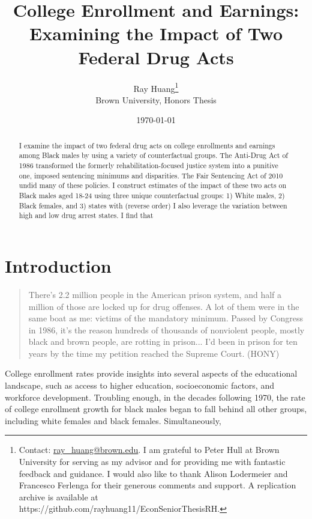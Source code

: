 \documentclass{article}
\title{College Enrollment and Earnings:
\texorpdfstring{\\}{} Examining the Impact of Two Federal Drug Acts}
\author{Ray Huang\thanks{Contact:
    \href{mailto:ray_huang@brown.edu}{ray\_huang@brown.edu}.
     I am grateful to Peter Hull at Brown University for serving as my advisor and for providing me with fantastic feedback and guidance. I would also like to thank Alison Lodermeier and Francesco Ferlenga for their generous comments and support. A replication archive is available at https://github.com/rayhuang11/EconSeniorThesisRH.}
     \\Brown University, Honors Thesis}
\date{\today}
\begin{document}
\maketitle

\begin{abstract}
\noindent I examine the impact of two federal drug acts on college enrollments and earnings among Black males by using a variety of counterfactual groups. The Anti-Drug Act of 1986 transformed the formerly rehabilitation-focused justice system into a punitive one, imposed sentencing minimums and disparities. The Fair Sentencing Act of 2010 undid many of these policies. I construct estimates of the impact of these two acts on Black males aged 18-24 using three unique counterfactual groups: 1) White males, 2) Black females, and 3) states with (reverse order) I also leverage the variation between high and low drug arrest states. I find that

\end{abstract}

\clearpage

\section{Introduction}

\begin{quote}
  There’s 2.2 million people in the American prison system, and half a million of those are locked up for drug offenses. A lot of them were in the same boat as me: victims of the mandatory minimum. Passed by Congress in 1986, it’s the reason hundreds of thousands of nonviolent people, mostly black and brown people, are rotting in prison... I’d been in prison for ten years by the time my petition reached the Supreme Court. (HONY)
\end{quote}

College enrollment rates provide insights into several aspects of the educational landscape, such as access to higher education, socioeconomic factors, and workforce development. Troubling enough, in the decades following 1970, the rate of college enrollment growth for black males began to fall behind all other groups, including white females and black females. Simultaneously,
\end{document}
